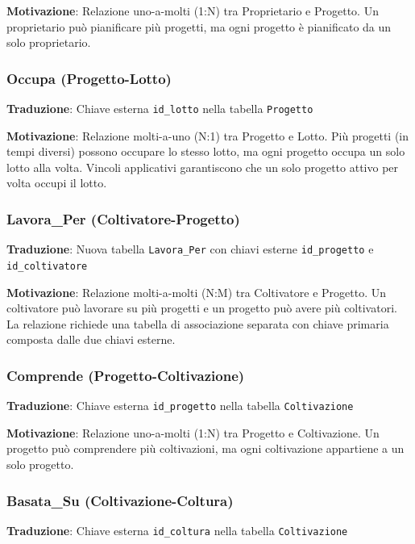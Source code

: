 \documentclass[12pt,a4paper]{article}
\begin{document}
\textbf{Motivazione}: Relazione uno-a-molti (1:N) tra Proprietario e Progetto. Un proprietario può pianificare più progetti, ma ogni progetto è pianificato da un solo proprietario.

\subsubsection{Occupa (Progetto-Lotto)}

\textbf{Traduzione}: Chiave esterna \texttt{id\_lotto} nella tabella \texttt{Progetto}

\textbf{Motivazione}: Relazione molti-a-uno (N:1) tra Progetto e Lotto. Più progetti (in tempi diversi) possono occupare lo stesso lotto, ma ogni progetto occupa un solo lotto alla volta. Vincoli applicativi garantiscono che un solo progetto attivo per volta occupi il lotto.

\subsubsection{Lavora\_Per (Coltivatore-Progetto)}

\textbf{Traduzione}: Nuova tabella \texttt{Lavora\_Per} con chiavi esterne \texttt{id\_progetto} e \texttt{id\_coltivatore}

\textbf{Motivazione}: Relazione molti-a-molti (N:M) tra Coltivatore e Progetto. Un coltivatore può lavorare su più progetti e un progetto può avere più coltivatori. La relazione richiede una tabella di associazione separata con chiave primaria composta dalle due chiavi esterne.

\subsubsection{Comprende (Progetto-Coltivazione)}

\textbf{Traduzione}: Chiave esterna \texttt{id\_progetto} nella tabella \texttt{Coltivazione}

\textbf{Motivazione}: Relazione uno-a-molti (1:N) tra Progetto e Coltivazione. Un progetto può comprendere più coltivazioni, ma ogni coltivazione appartiene a un solo progetto.

\subsubsection{Basata\_Su (Coltivazione-Coltura)}

\textbf{Traduzione}: Chiave esterna \texttt{id\_coltura} nella tabella \texttt{Coltivazione}
\end{document}
